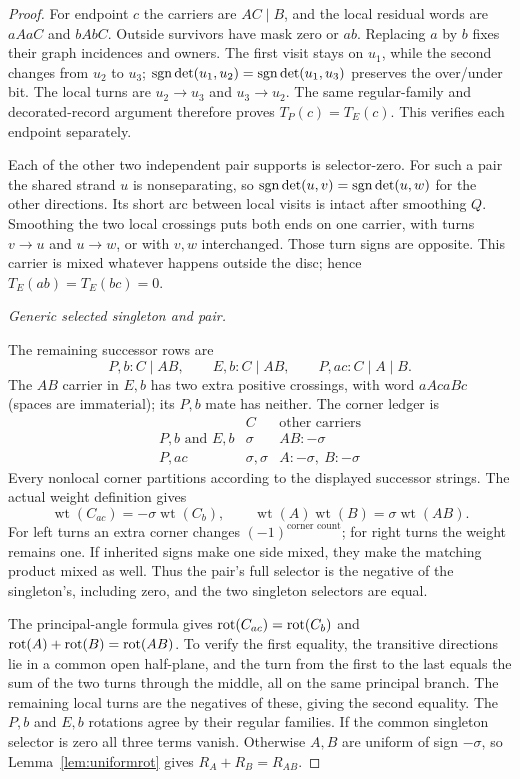 \begin{proof}
For endpoint $c$ the carriers are $AC\mid B$, and the local residual
words are $aAaC$ and $bAbC$. Outside survivors have mask zero or
$ab$. Replacing $a$ by $b$ fixes their graph incidences and owners.
The first visit stays on $u_1$, while the second changes from $u_2$
to $u_3$; $\operatorname{sgn}\det(u_1,u_2)=\operatorname{sgn}\det(u_1,u_3)$ preserves the
over/under bit. The local turns are $u_2\to u_3$ and $u_3\to u_2$.
The same regular-family and decorated-record argument therefore proves
$T_P(c)=T_E(c)$. This verifies each endpoint separately.

Each of the other two independent pair supports is selector-zero.
For such a pair the shared strand $u$ is nonseparating, so
$\operatorname{sgn}\det(u,v)=\operatorname{sgn}\det(u,w)$ for the other directions. Its short
arc between local visits is intact after smoothing $Q$. Smoothing
the two local crossings puts both ends on one carrier, with turns
$v\to u$ and $u\to w$, or with $v,w$ interchanged. Those turn
signs are opposite. This carrier is mixed whatever happens outside
the disc; hence $T_E(ab)=T_E(bc)=0$.

\par\medskip\noindent\emph{Generic selected singleton and pair.}\par
The remaining successor rows are
\[
 P,b:C\mid AB,\qquad E,b:C\mid AB,\qquad P,ac:C\mid A\mid B.
\]
The $AB$ carrier in $E,b$ has two extra positive crossings, with word
$aAc aBc$ (spaces are immaterial); its $P,b$ mate has neither.
The corner ledger is
\begin{equation}\label{rtr:generic-turns}
\begin{array}{c|cc}
 &C&\text{other carriers}\\ \hline
 P,b\text{ and }E,b&\sigma&AB:-\sigma\\
 P,ac&\sigma,\sigma&A:-\sigma,\ B:-\sigma
\end{array}
\end{equation}
Every nonlocal corner partitions according to the displayed successor
strings. The actual weight definition gives
\[
 \operatorname{wt}(C_{ac})=-\sigma\operatorname{wt}(C_b),\qquad
 \operatorname{wt}(A)\operatorname{wt}(B)
       =\sigma\operatorname{wt}(AB).
\]
For left turns an extra corner changes $(-1)^{\text{corner count}}$;
for right turns the weight remains one. If inherited signs make one
side mixed, they make the matching product mixed as well. Thus the
pair's full selector is the negative of the singleton's, including
zero, and the two singleton selectors are equal.

The principal-angle formula gives
$\operatorname{rot}(C_{ac})=\operatorname{rot}(C_b)$ and
$\operatorname{rot}(A)+\operatorname{rot}(B)=\operatorname{rot}(AB)$. To verify the first equality, the
transitive directions lie in a common open half-plane, and the turn
from the first to the last equals the sum of the two turns through
the middle, all on the same principal branch. The remaining local
turns are the negatives of these, giving the second equality.
The $P,b$ and $E,b$ rotations agree by their regular families.
If the common singleton selector is zero all three terms vanish.
Otherwise $A,B$ are uniform of sign $-\sigma$, so
Lemma~\ref{lem:uniformrot} gives
$R_A+R_B=R_{AB}$.


\end{proof}
